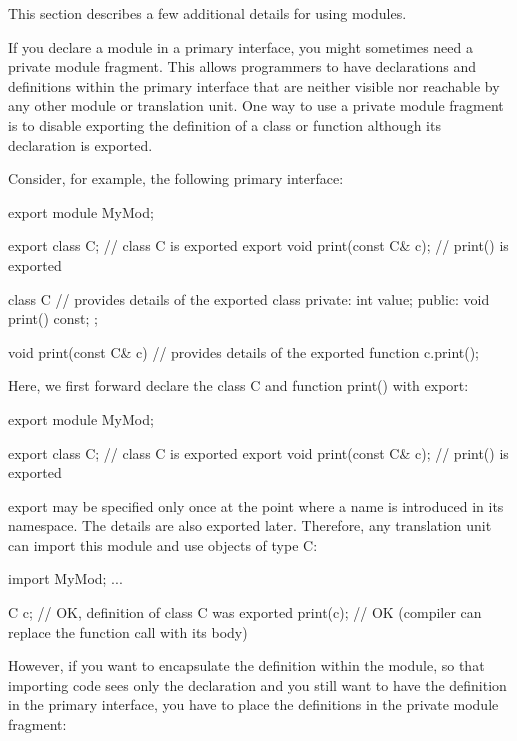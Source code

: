 
This section describes a few additional details for using modules.


If you declare a module in a primary interface, you might sometimes need a private module fragment. This allows programmers to have declarations and definitions within the primary interface that are neither visible nor reachable by any other module or translation unit. One way to use a private module fragment is to disable exporting the definition of a class or function although its declaration is exported.

Consider, for example, the following primary interface:

\begin{cpp}
export module MyMod;

export class C; // class C is exported
export void print(const C& c); // print() is exported

class C { // provides details of the exported class
private:
	int value;
public:
	void print() const;
};

void print(const C& c) { // provides details of the exported function
	c.print();
}
\end{cpp}

Here, we first forward declare the class C and function print() with export:

\begin{cpp}
export module MyMod;

export class C; // class C is exported
export void print(const C& c); // print() is exported
\end{cpp}

export may be specified only once at the point where a name is introduced in its namespace. The details are also exported later. Therefore, any translation unit can import this module and use objects of type C:

\begin{cpp}
import MyMod;
...

C c; // OK, definition of class C was exported
print(c); // OK (compiler can replace the function call with its body)
\end{cpp}

However, if you want to encapsulate the definition within the module, so that importing code sees only the declaration and you still want to have the definition in the primary interface, you have to place the definitions in the private module fragment:

